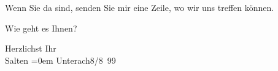 \pstart
           Wenn Sie da sind, senden Sie mir eine Zeile, wo wir uns treffen können.\pend
           
\pstart
           Wie geht es Ihnen?\pend
           
\pstart
           Herzlichst Ihr {\\[\baselineskip]}\spacefill\mbox{Salten}\pend
           \leftskip=0em{}
\pstart
           Unterach8/8 99\pend
           \endnumbering{}  \newcommand{\dateiname}{L03296}\newcommand{\titel}{Felix Salten an Arthur Schnitzler, 8. 8. 1899}\newcommand{\editorInnen}{Martin Anton Müller und Laura Untner}
